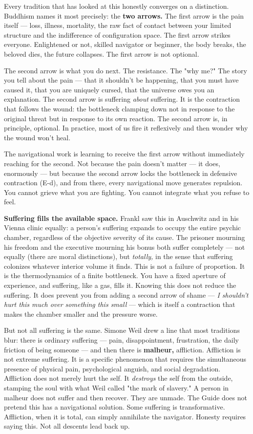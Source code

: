 Every tradition that has looked at this honestly converges on a distinction. Buddhism names it most precisely: the \textbf{two arrows.} The first arrow is the pain itself — loss, illness, mortality, the raw fact of contact between your limited structure and the indifference of configuration space. The first arrow strikes everyone. Enlightened or not, skilled navigator or beginner, the body breaks, the beloved dies, the future collapses. The first arrow is not optional.


The second arrow is what you do next. The resistance. The "why me?" The story you tell about the pain — that it shouldn't be happening, that you must have caused it, that you are uniquely cursed, that the universe owes you an explanation. The second arrow is suffering \textit{about} suffering. It is the contraction that follows the wound: the bottleneck clamping down not in response to the original threat but in response to its own reaction. The second arrow is, in principle, optional. In practice, most of us fire it reflexively and then wonder why the wound won't heal.


The navigational work is learning to receive the first arrow without immediately reaching for the second. Not because the pain doesn't matter — it does, enormously — but because the second arrow locks the bottleneck in defensive contraction (E-d), and from there, every navigational move generates repulsion. You cannot grieve what you are fighting. You cannot integrate what you refuse to feel.


\textbf{Suffering fills the available space.} Frankl saw this in Auschwitz and in his Vienna clinic equally: a person's suffering expands to occupy the entire psychic chamber, regardless of the objective severity of its cause. The prisoner mourning his freedom and the executive mourning his bonus both suffer completely — not equally (there are moral distinctions), but \textit{totally,} in the sense that suffering colonizes whatever interior volume it finds. This is not a failure of proportion. It is the thermodynamics of a finite bottleneck. You have a fixed aperture of experience, and suffering, like a gas, fills it. Knowing this does not reduce the suffering. It does prevent you from adding a second arrow of shame — \textit{I shouldn't hurt this much over something this small} — which is itself a contraction that makes the chamber smaller and the pressure worse.


But not all suffering is the same. Simone Weil drew a line that most traditions blur: there is ordinary suffering — pain, disappointment, frustration, the daily friction of being someone — and then there is \textbf{malheur,} affliction. Affliction is not extreme suffering. It is a specific phenomenon that requires the simultaneous presence of physical pain, psychological anguish, and social degradation. Affliction does not merely hurt the self. It \textit{destroys} the self from the outside, stamping the soul with what Weil called "the mark of slavery." A person in malheur does not suffer and then recover. They are unmade. The Guide does not pretend this has a navigational solution. Some suffering is transformative. Affliction, when it is total, can simply annihilate the navigator. Honesty requires saying this. Not all descents lead back up.



